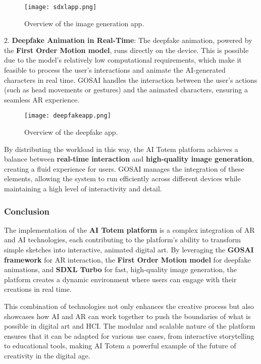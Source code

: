 \begin{figure}[h]
    \centering
    \texttt{[image: sdxlapp.png]}
    \caption{Overview of the image generation app.}
    \vspace{0.1cm}
    \label{fig:imgenapp}
\end{figure}

2.  \textbf{Deepfake Animation in Real-Time}: The deepfake animation, powered by the \textbf{First Order Motion model}, runs directly on the device.
This is possible due to the model's relatively low computational requirements, which make it feasible to process the user's interactions and animate the AI-generated characters in real time.
GOSAI handles the interaction between the user's actions (such as head movements or gestures) and the animated characters, ensuring a seamless AR experience.

\begin{figure}[h]
    \centering
    \texttt{[image: deepfakeapp.png]}
    \caption{Overview of the deepfake app.}
    \vspace{0.1cm}
    \label{fig:deepfakeapp}
\end{figure}
    

By distributing the workload in this way, the AI Totem platform achieves a balance between \textbf{real-time interaction} and \textbf{high-quality image generation}, creating a fluid experience for users.
GOSAI manages the integration of these elements, allowing the system to run efficiently across different devices while maintaining a high level of interactivity and detail.



\subsubsection{ Conclusion}

The implementation of the \textbf{AI Totem platform} is a complex integration of AR and AI technologies, each contributing to the platform's ability to transform simple sketches into interactive, animated digital art.
By leveraging the \textbf{GOSAI framework} for AR interaction, the \textbf{First Order Motion model} for deepfake animations, and \textbf{SDXL Turbo} for fast, high-quality image generation, the platform creates a dynamic environment where users can engage with their creations in real time.

This combination of technologies not only enhances the creative process but also showcases how AI and AR can work together to push the boundaries of what is possible in digital art and HCI.
The modular and scalable nature of the platform ensures that it can be adapted for various use cases, from interactive storytelling to educational tools, making AI Totem a powerful example of the future of creativity in the digital age.